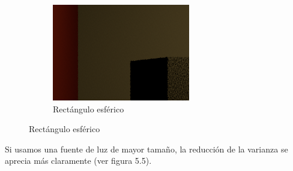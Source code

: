 \begin{figure}[h]
{\begin{minipage}{\dimexpr .5\textwidth-\fboxsep-2\fboxrule}
\begin{subfigure}{\textwidth}
            \includegraphics[width=\textwidth]{imagenes/rect21}
            \caption{Rectángulo esférico}
            \end{subfigure}%
  \end{minipage}}
\end{figure}

Si usamos una fuente de luz de mayor tamaño, la reducción de la varianza se aprecia más claramente (ver figura 5.5).   

